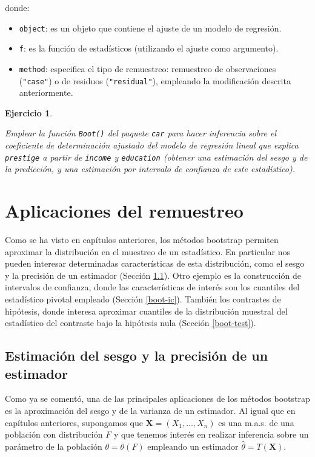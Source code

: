 \documentclass[
]{book}
\theoremstyle{break}
\newtheorem{exercise}{Ejercicio}[chapter]
\theoremstyle{nonumberplain}
\begin{document}
donde:

\begin{itemize}
\item
  \texttt{object}: es un objeto que contiene el ajuste de un modelo de regresión.
\item
  \texttt{f}: es la función de estadísticos (utilizando el ajuste como argumento).
\item
  \texttt{method}: especifica el tipo de remuestreo: remuestreo de observaciones (\texttt{"case"})
  o de residuos (\texttt{"residual"}), empleando la modificación descrita anteriormente.
\end{itemize}

\begin{exercise}
\protect\hypertarget{exr:boot-car}{}\label{exr:boot-car}

Emplear la función \texttt{Boot()} del paquete \texttt{car} para hacer inferencia sobre
el coeficiente de determinación ajustado del modelo de regresión lineal
que explica \texttt{prestige} a partir de \texttt{income} y \texttt{education}
(obtener una estimación del sesgo y de la predicción,
y una estimación por intervalo de confianza de este estadístico).
\end{exercise}

\hypertarget{boot-aplic}{%
\chapter{Aplicaciones del remuestreo}\label{boot-aplic}}

Como se ha visto en capítulos anteriores, los métodos bootstrap permiten aproximar la distribución en el muestreo de un estadístico.
En particular nos pueden interesar determinadas características de esta distribución, como el sesgo y la precisión de un estimador (Sección \ref{sesgo-prec}).
Otro ejemplo es la construcción de intervalos de confianza, donde las características de interés son los cuantiles del estadístico pivotal empleado (Sección \ref{boot-ic}).
También los contrastes de hipótesis, donde interesa aproximar cuantiles de la distribución muestral del estadístico del contraste bajo la hipótesis nula (Sección \ref{boot-test}).

\hypertarget{sesgo-prec}{%
\section{Estimación del sesgo y la precisión de un estimador}\label{sesgo-prec}}

Como ya se comentó, una de las principales aplicaciones de los métodos bootstrap es la aproximación del sesgo y de la varianza de un estimador.
Al igual que en capítulos anteriores, supongamos que \(\mathbf{X}=\left( X_1,\ldots ,X_n \right)\) es una m.a.s. de una población con distribución \(F\) y que tenemos interés en realizar inferencia sobre un parámetro de la población \(\theta =\theta \left( F \right)\) empleando un estimador \(\hat{\theta}=T\left( \mathbf{X} \right)\).
\end{document}
